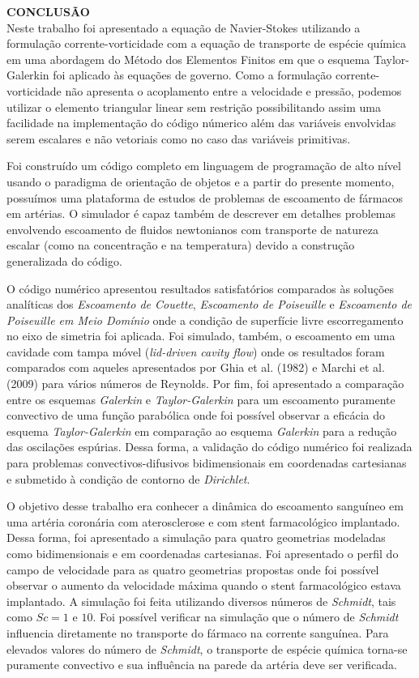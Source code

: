 \clearpage
\noindent\textbf{CONCLUSÃO}
$\!$\\

Neste trabalho foi apresentado a equação de Navier-Stokes
utilizando a formulação corrente-vorticidade
com a equação de transporte de espécie química em uma abordagem
do Método dos Elementos Finitos em que o esquema Taylor-Galerkin
foi aplicado às equações de governo. Como a formulação corrente-vorticidade
não apresenta o acoplamento entre a velocidade e pressão,
podemos utilizar o elemento triangular linear sem restrição
possibilitando assim uma facilidade na implementação do código
númerico além das variáveis envolvidas serem escalares e não vetoriais
como no caso das variáveis primitivas.

\medskip
Foi construído um código completo em linguagem de programação de alto nível 
usando o paradigma de orientação de objetos e a partir do presente momento,
possuímos uma plataforma de estudos de problemas de escoamento de fármacos
em artérias. O simulador é capaz também de descrever em detalhes problemas
envolvendo escoamento de fluidos newtonianos com transporte de natureza
escalar (como na concentração e na temperatura) devido a construção 
generalizada do código.

\medskip
O código numérico apresentou
resultados satisfatórios comparados às soluções analíticas dos
\textit{Escoamento de Couette}, \textit{Escoamento de Poiseuille}
e \textit{Escoamento de Poiseuille em Meio Domínio} onde a condição
de superfície livre escorregamento no eixo de simetria foi aplicada.
Foi simulado, também, o escoamento em uma cavidade com tampa móvel (\textit{lid-driven cavity flow})
onde os resultados foram comparados com aqueles apresentados por Ghia et al. (1982) \cite{ghia1982} e Marchi et al. (2009) \cite{marchi2009}
para vários números de Reynolds.
Por fim, foi apresentado a comparação
entre os esquemas \textit{Galerkin} e \textit{Taylor-Galerkin} para um
escoamento puramente convectivo de uma função parabólica onde foi
possível observar a eficácia do esquema \textit{Taylor-Galerkin}
em comparação ao esquema \textit{Galerkin} para a redução das
oscilações espúrias. 
Dessa forma, a validação do código numérico foi realizada
para problemas convectivos-difusivos bidimensionais em coordenadas cartesianas e submetido à condição de contorno de
\textit{Dirichlet}.

\medskip
O objetivo desse trabalho era conhecer a dinâmica do escoamento
sanguíneo em uma artéria coronária com aterosclerose e com 
stent farmacológico implantado. Dessa forma, foi apresentado a simulação
para quatro geometrias modeladas como bidimensionais e
em coordenadas cartesianas. 
Foi apresentado o perfil do campo de velocidade para as quatro geometrias propostas onde foi
possível observar o aumento da velocidade máxima quando o stent
farmacológico estava implantado.  
A simulação foi feita utilizando diversos números de \textit{Schmidt},
tais como $Sc = 1$ e $10$. Foi possível verificar na simulação que o número de
\textit{Schmidt} influencia diretamente no transporte do fármaco
na corrente sanguínea. Para elevados valores do número de \textit{Schmidt},
o transporte de espécie química torna-se puramente convectivo
e sua influência na parede da artéria deve ser verificada.

